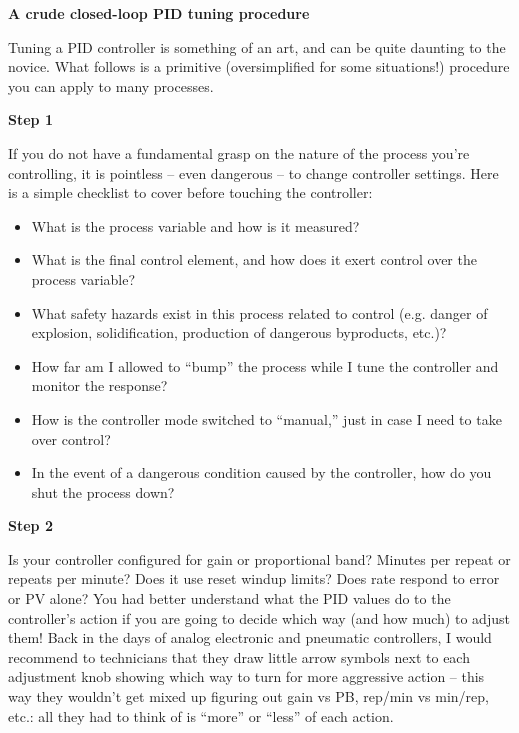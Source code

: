 \vfil \eject

\centerline{\bf A crude closed-loop PID tuning procedure}

\vskip 10pt

Tuning a PID controller is something of an art, and can be quite daunting to the novice.  What follows is a primitive (oversimplified for some situations!) procedure you can apply to many processes.

\vskip 10pt

\noindent
{\bf Step 1}

  If you do not have a fundamental grasp on the nature of the process you're controlling, it is pointless -- even dangerous -- to change controller settings.  Here is a simple checklist to cover before touching the controller:

\begin{itemize}
\item{} What is the process variable and how is it measured?
\item{} What is the final control element, and how does it exert control over the process variable?
\item{} What safety hazards exist in this process related to control (e.g. danger of explosion, solidification, production of dangerous byproducts, etc.)?  
\item{} How far am I allowed to ``bump'' the process while I tune the controller and monitor the response?
\item{} How is the controller mode switched to ``manual,'' just in case I need to take over control?
\item{} In the event of a dangerous condition caused by the controller, how do you shut the process down?
\end{itemize}

\vskip 10pt

\noindent
{\bf Step 2}

  Is your controller configured for gain or proportional band?  Minutes per repeat or repeats per minute?  Does it use reset windup limits?  Does rate respond to error or PV alone?  You had better understand what the PID values do to the controller's action if you are going to decide which way (and how much) to adjust them!  Back in the days of analog electronic and pneumatic controllers, I would recommend to technicians that they draw little arrow symbols next to each adjustment knob showing which way to turn for more aggressive action -- this way they wouldn't get mixed up figuring out gain vs PB, rep/min vs min/rep, etc.: all they had to think of is ``more'' or ``less'' of each action.

